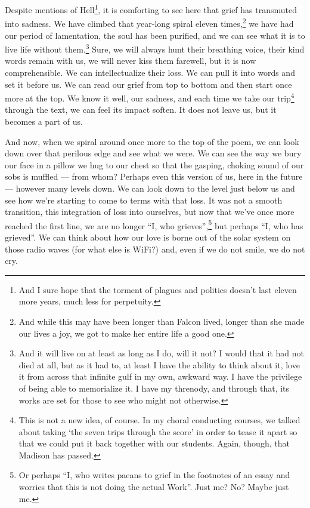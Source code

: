 \documentclass[12pt]{memoir}
\begin{document}
Despite mentions of Hell\footnote{And I sure hope that the torment of plagues and politics doesn't last eleven more years, much less for perpetuity.}, it is comforting to see here that grief has transmuted into sadness. We have climbed that year-long spiral eleven times,\footnote{And while this may have been longer than Falcon lived, longer than she made our lives a joy, we got to make her entire life a good one.} we have had our period of lamentation, the soul has been purified, and we can see what it is to live life without them.\footnote{And it will live on at least as long as I do, will it not? I would that it had not died at all, but as it had to, at least I have the ability to think about it, love it from across that infinite gulf in my own, awkward way. I have the privilege of being able to memorialize it. I have my threnody, and through that, its works are set for those to see who might not otherwise.} Sure, we will always hunt their breathing voice, their kind words remain with us, we will never kiss them farewell, but it is now comprehensible. We can intellectualize their loss. We can pull it into words and set it before us. We can read our grief from top to bottom and then start once more at the top. We know it well, our sadness, and each time we take our trip\footnote{This is not a new idea, of course. In my choral conducting courses, we talked about taking `the seven trips through the score' in order to tease it apart so that we could put it back together with our students. Again, though, that Madison has passed.} through the text, we can feel its impact soften. It does not leave us, but it becomes  a part of us.

And now, when we spiral around once more to the top of the poem, we can look down over that perilous edge and see what we were. We can see the way we bury our face in a pillow we hug to our chest so that the gasping, choking sound of our sobs is muffled --- from whom? Perhaps even this version of us, here in the future --- however many levels down. We can look down to the level just below us and see how we're starting to come to terms with that loss. It was not a smooth transition, this integration of loss into ourselves, but now that we've once more reached the first line, we are no longer ``I, who grieves'',\footnote{Or perhaps ``I, who writes paeans to grief in the footnotes of an essay and worries that this is not doing the actual Work''. Just me? No? Maybe just me.} but perhaps ``I, who has grieved''. We can think about how our love is borne out of the solar system on those radio waves (for what else is WiFi?) and, even if we do not smile, we do not cry.
\end{document}
